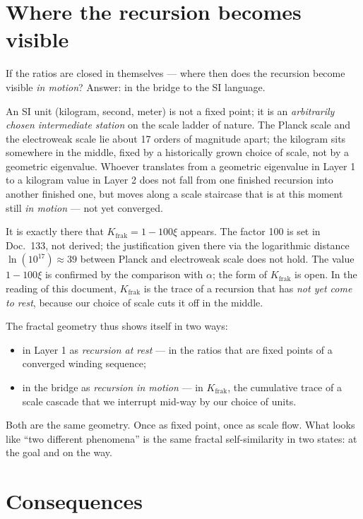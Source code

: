 \section{Where the recursion becomes visible}

If the ratios are closed in themselves --- where then does the
recursion become visible \emph{in motion}? Answer: in the bridge to
the SI language.

An SI unit (kilogram, second, meter) is not a fixed point; it is an
\emph{arbitrarily chosen intermediate station} on the scale ladder of
nature. The Planck scale and the electroweak scale lie about 17 orders
of magnitude apart; the kilogram sits somewhere in the middle, fixed
by a historically grown choice of scale, not by a geometric eigenvalue.
Whoever translates from a geometric eigenvalue in Layer 1 to a
kilogram value in Layer 2 does not fall from one finished recursion
into another finished one, but moves along a scale staircase that is
at this moment still \emph{in motion} --- not yet converged.

It is exactly there that $K_{\mathrm{frak}} = 1 - 100\xi$ appears. The
factor 100 is set in Doc.~133, not derived; the justification given
there via the logarithmic distance $\ln(10^{17}) \approx 39$ between
Planck and electroweak scale does not hold. The value $1 - 100\xi$ is
confirmed by the comparison with $\alpha$; the form of
$K_{\mathrm{frak}}$ is open. In the reading of this document,
$K_{\mathrm{frak}}$ is the trace of a recursion that has \emph{not yet
come to rest}, because our choice of scale cuts it off in the middle.

The fractal geometry thus shows itself in two ways:

\begin{itemize}\setlength\itemsep{2pt}
  \item in Layer 1 as \emph{recursion at rest} ---
        in the ratios that are fixed points of a converged
        winding sequence;
  \item in the bridge as \emph{recursion in motion} ---
        in $K_{\mathrm{frak}}$, the cumulative trace of a
        scale cascade that we interrupt mid-way by our choice
        of units.
\end{itemize}

\noindent
Both are the same geometry. Once as fixed point, once as scale flow.
What looks like ``two different phenomena'' is the same fractal
self-similarity in two states: at the goal and on the way.

\section{Consequences}

